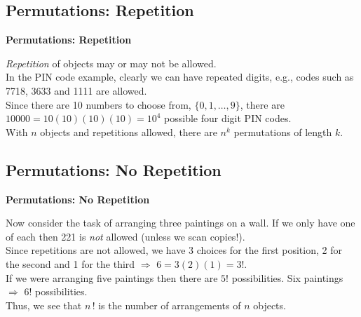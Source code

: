 \documentclass[compress]{beamer}        %
\makeatletter
\newcommand{\tcb}{\textcolor{beamer@blendedblue}}
\makeatother
\begin{document}
\subsection{Permutations: Repetition}
\begin{frame}{\bf \tcb{Permutations: Repetition}}

\emph{Repetition} of objects may or may not be allowed.\\[1cm]

In the PIN code example, clearly we can have repeated digits, e.g., codes such as 7718, 3633 and 1111 are allowed.\\[0.5cm]

Since there are 10 numbers to choose from, $\{0,1,\ldots,9\}$, there are $10000 = 10(10)(10)(10) = 10^4$ possible four digit PIN codes.\\[1cm]

With $n$ objects and repetitions allowed, there are $\boxed{n^k}$ permutations of length $k$.

\end{frame}

\subsection{Permutations: No Repetition}
\begin{frame}{\bf \tcb{Permutations: No Repetition}}

Now consider the task of arranging three paintings on a wall. If we only have one of each then 221 is \emph{not} allowed {\footnotesize(unless we scan copies!).}\\[0.5cm]

Since repetitions are not allowed, we have 3 choices for the first position, 2 for the second and 1 for the third $\Rightarrow$ $6 = 3(2)(1) = 3!$.\\[0.5cm]

If we were arranging five paintings then there are $5!$ possibilities. Six paintings $\Rightarrow$ $6!$ possibilities.\\[1cm]

Thus, we see that $\boxed{n\,!}$ is the number of arrangements of $n$ objects.

\end{frame}
\end{document}
